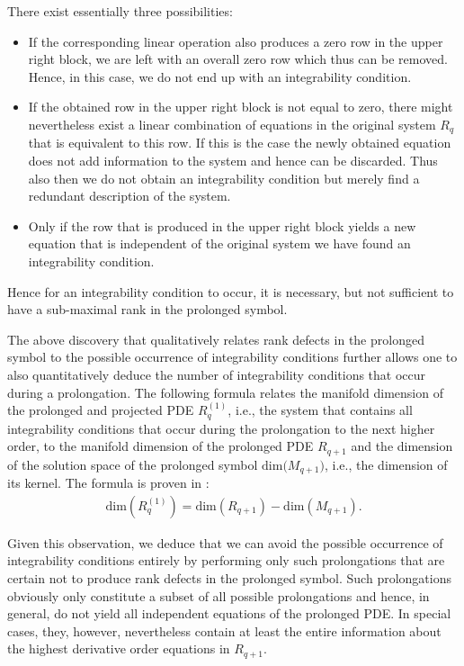 There exist essentially three possibilities:
\begin{itemize}
    \item If the corresponding linear operation also produces a zero row in the upper right block, we are left with an overall zero row which thus can be removed. 
    Hence, in this case, we do not end up with an integrability condition.\\
    \item If the obtained row in the upper right block is not equal to zero, there might nevertheless exist a linear combination of equations in the original system $R_q$ that is equivalent to this row. 
    If this is the case the newly obtained equation does not add information to the system and hence can be discarded. Thus also then we do not obtain an integrability condition but merely find a redundant description of the system.\\
    \item Only if the row that is produced in the upper right block yields a new equation that is independent of the original system we have found an integrability condition.  
\end{itemize}
Hence for an integrability condition to occur, it is necessary, but not sufficient to have a sub-maximal rank in the prolonged symbol.

The above discovery that qualitatively relates rank defects in the prolonged symbol to the possible occurrence of integrability conditions further allows one  to also quantitatively deduce the number of integrability conditions that occur during a prolongation.
The following formula relates the manifold dimension of the prolonged and projected PDE $R_q^{(1)}$, i.e., the system that contains all integrability conditions that occur during the prolongation to the next higher order, to the manifold dimension of the prolonged PDE $R_{q+1}$ and the dimension of the solution space of the prolonged symbol $\mathrm{dim(}M_{q+1})$, i.e., the dimension of its kernel. The formula is proven in \cite{seiler1994analysis}:
\begin{align}
    \mathrm{dim}(R_{q}^{(1)}) = \mathrm{dim}(R_{q+1}) - \mathrm{dim}(M_{q+1}).
\end{align}

Given this observation, we deduce that we can avoid the possible occurrence of integrability conditions entirely by performing only such prolongations that are certain not to produce rank defects in the prolonged symbol. Such prolongations obviously only constitute a subset of all possible prolongations and hence, in general, do not yield all independent equations of the prolonged PDE. In special cases, they, however, nevertheless contain at least the entire information about the highest derivative order equations in $R_{q+1}$.

